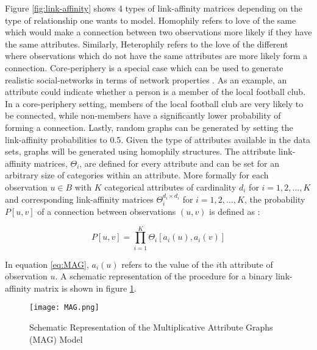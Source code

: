 	\noindent Figure \ref{fig:link-affinity} shows 4 types of link-affinity
	matrices depending on the type of relationship one wants to model. Homophily 
	refers to love of the same which would make a connection between two
	observations more likely if they have the same attributes. Similarly,
	Heterophily refers to the love of the different where observations which do 
	not have the same attributes are more likely form a connection. 
	Core-periphery is a special case which can be used to generate realistic 
	social-networks in terms of network properties 
	\citep[p. 139]{kim2012multiplicative}. As an example, an attribute could
	indicate whether a person is a member of the local football club. In a
	core-periphery setting, members of the local football club are very likely
	to be connected, while non-members have a significantly lower probability
	of forming a connection. Lastly, random graphs can be generated by setting the
	link-affinity probabilities to 0.5. Given the type of attributes available
	in the data sets, graphs will be generated using homophily structures. The 
	attribute link-affinity matrices, $\Theta_i$, are defined for every attribute 
	and can be set for an arbitrary size of categories within an attribute. 
	More formally for each observation $u \in B$ with $K$ categorical attributes 
	of cardinality $d_i$ for $i = 1,2,\dots,K$ and corresponding link-affinity 
	matrices $\Theta_{i}^{d_{i} \times d_{i}}$ for $i=1,2,\dots,K$, the probability 
	$P[u,v]$ of a connection between observations $(u,v)$ is defined as 
	\citep[p. 119]{kim2012multiplicative}:

	\begin{equation}
		P[u,v] = \prod_{i=1}^{K}\Theta_{i}\left[a_{i}(u),a_i(v)\right]
		\label{eq:MAG}
	\end{equation}

	\noindent In equation \ref{eq:MAG}, $a_{i}(u)$ refers to the value of the 
	$i$th attribute of observation $u$. A schematic representation of the 
	procedure for a binary link-affinity matrix is shown in figure \ref{fig:MAG}.

	\begin{figure}[h]
		\centering
		\texttt{[image: MAG.png]}
		\caption{Schematic Representation of the 
			Multiplicative Attribute Graphs (MAG) Model}
		\cite[p. 120]{kim2012multiplicative}
		\label{fig:MAG}
	\end{figure}
	
